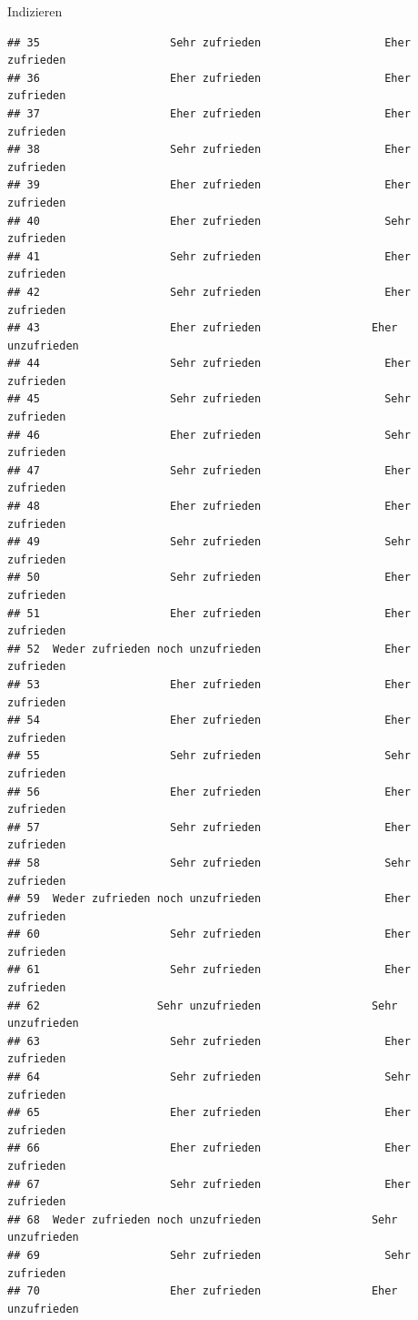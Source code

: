 \documentclass[ignorenonframetext,]{beamer}
\begin{document}
\begin{frame}[fragile]{Indizieren}
\begin{verbatim}
## 35                    Sehr zufrieden                   Eher zufrieden
## 36                    Eher zufrieden                   Eher zufrieden
## 37                    Eher zufrieden                   Eher zufrieden
## 38                    Sehr zufrieden                   Eher zufrieden
## 39                    Eher zufrieden                   Eher zufrieden
## 40                    Eher zufrieden                   Sehr zufrieden
## 41                    Sehr zufrieden                   Eher zufrieden
## 42                    Sehr zufrieden                   Eher zufrieden
## 43                    Eher zufrieden                 Eher unzufrieden
## 44                    Sehr zufrieden                   Eher zufrieden
## 45                    Sehr zufrieden                   Sehr zufrieden
## 46                    Eher zufrieden                   Sehr zufrieden
## 47                    Sehr zufrieden                   Eher zufrieden
## 48                    Eher zufrieden                   Eher zufrieden
## 49                    Sehr zufrieden                   Sehr zufrieden
## 50                    Sehr zufrieden                   Eher zufrieden
## 51                    Eher zufrieden                   Eher zufrieden
## 52  Weder zufrieden noch unzufrieden                   Eher zufrieden
## 53                    Eher zufrieden                   Eher zufrieden
## 54                    Eher zufrieden                   Eher zufrieden
## 55                    Sehr zufrieden                   Sehr zufrieden
## 56                    Eher zufrieden                   Eher zufrieden
## 57                    Sehr zufrieden                   Eher zufrieden
## 58                    Sehr zufrieden                   Sehr zufrieden
## 59  Weder zufrieden noch unzufrieden                   Eher zufrieden
## 60                    Sehr zufrieden                   Eher zufrieden
## 61                    Sehr zufrieden                   Eher zufrieden
## 62                  Sehr unzufrieden                 Sehr unzufrieden
## 63                    Sehr zufrieden                   Eher zufrieden
## 64                    Sehr zufrieden                   Sehr zufrieden
## 65                    Eher zufrieden                   Eher zufrieden
## 66                    Eher zufrieden                   Eher zufrieden
## 67                    Sehr zufrieden                   Eher zufrieden
## 68  Weder zufrieden noch unzufrieden                 Sehr unzufrieden
## 69                    Sehr zufrieden                   Sehr zufrieden
## 70                    Eher zufrieden                 Eher unzufrieden

\end{verbatim}
\end{frame}
\end{document}
